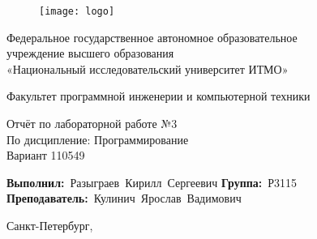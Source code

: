 \newcommand{\Faculty}{Факультет программной инженерии и компьютерной техники}

\newcommand{\TeacherPosition}{}
\newcommand{\TeacherName}{Кулинич Ярослав Вадимович}

\newcommand{\LabSubject}{Программирование}
\newcommand{\LabNumber}{№3}
\newcommand{\Variant}{110549}

\newcommand{\StudentGroup}{Р3115}
\newcommand{\StudentName}{Разыграев Кирилл Сергеевич}


\thispagestyle{empty}
\setlength{\parindent}{0cm} %

\begin{figure}[h]
	\centering
	\texttt{[image: logo]}
\end{figure}
\vspace{-\baselineskip}


\begin{center}
	Федеральное государственное автономное образовательное \\
	учреждение высшего образования\\
	«Национальный исследовательский университет ИТМО»
\end{center}\par

\begin{center}
	\vspace{12pt}
	\Faculty
\end{center}\par

\vspace{\fill}
\begin{center}
	Отчёт по лабораторной работе \LabNumber \\
	По дисципление: \LabSubject \\
	Вариант \Variant
\end{center}\par

\vspace{\fill}
\vbox{
	\hfill
	\vbox{
		\hbox{\textbf{Выполнил:} \StudentName}
		\hbox{\textbf{Группа:} \StudentGroup \\}
		\hbox{\textbf{Преподаватель:} \TeacherPosition \TeacherName}
	}
} 


\vspace{\fill}
\begin{center}
	Санкт-Петербург, \the\year{}
\end{center}\par

\newpage

\setlength{\parindent}{1.25cm} %
